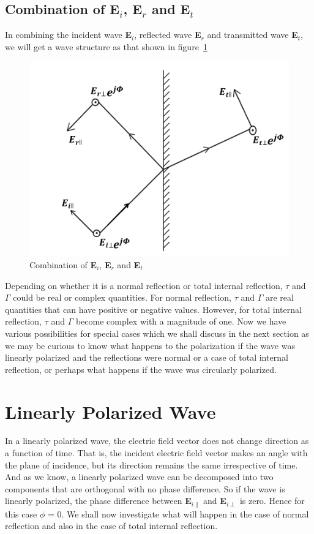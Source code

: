 \subsection{Combination of \textbf{E$_i$}, \textbf{E$_r$} and \textbf{E$_t$}}
In combining the incident wave \textbf{E$_i$}, reflected wave \textbf{E$_r$} and transmitted wave \textbf{E$_t$}, we will get a wave structure as that shown in figure~\ref{fig:mcben}	
\begin{figure}[h]
\centering
\includegraphics[width=1\linewidth]{./graphics/orthogonal_components}
\caption{Combination of \textbf{E$_i$}, \textbf{E$_r$} and \textbf{E$_t$}}
\label{fig:mcben}
\end{figure}

Depending on whether it is a normal reflection or total internal reflection, $\tau$ and $\Gamma$ could be real or complex quantities. For normal reflection, $\tau$ and $\Gamma$ are real quantities that can have positive or negative values. However, for total internal reflection, $\tau$ and $\Gamma$ become complex with a magnitude of one. Now we have various possibilities for special cases which we shall discuss in the next section as we may be curious to know what happens to the polarization if the wave was linearly polarized and the reflections were normal or a case of total internal reflection, or perhaps what happens if the wave was circularly polarized.

\section{Linearly Polarized Wave}
In a linearly polarized wave, the electric field vector does not change direction as a function of time. That is, the incident electric field vector makes an angle with the plane of incidence, but its direction remains the same irrespective of time. And as we know, a linearly polarized wave can be decomposed into two components that are orthogonal with no phase difference. So if the wave is linearly polarized, the phase difference between \textbf{E}$_{i\parallel}$ and \textbf{E}$_{i\perp}$ is zero. Hence for this case $\phi$ = 0. We shall now investigate what will happen in the case of normal reflection and also in the case of total internal reflection.

